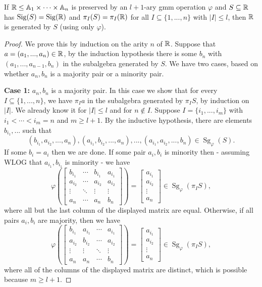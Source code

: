 \documentclass[letterpaper,11pt]{article}
\DeclareMathOperator{\Sg}{Sg}
\DeclareMathOperator{\Sig}{Sig}
\begin{document}
\begin{thm}\label{gmm-compact} If $\mathbb{R} \le \mathbb{A}_1 \times \cdots \times \mathbb{A}_n$ is preserved by an $l+1$-ary gmm operation $\varphi$ and $S \subseteq \mathbb{R}$ has $\Sig(S) = \Sig(\RR)$ and $\pi_I(S) = \pi_I(\mathbb{R})$ for all $I \subseteq \{1, ..., n\}$ with $|I| \le l$, then $\mathbb{R}$ is generated by $S$ (using only $\varphi$).
\end{thm}
\begin{proof} We prove this by induction on the arity $n$ of $\mathbb{R}$. Suppose that $a = (a_1, ..., a_n) \in \mathbb{R}$, by the induction hypothesis there is some $b_n$ with $(a_1, ..., a_{n-1}, b_n)$ in the subalgebra generated by $S$. We have two cases, based on whether $a_n,b_n$ is a majority pair or a minority pair.

{\bf Case 1: }$a_n,b_n$ is a majority pair. In this case we show that for every $I \subseteq \{1, ..., n\}$, we have $\pi_I a$ in the subalgebra generated by $\pi_I S$, by induction on $|I|$. We already know it for $|I| \le l$ and for $n \not\in I$. Suppose $I = \{i_1, ..., i_m\}$ with $i_1 < \cdots < i_m = n$ and $m \ge l+1$. By the inductive hypothesis, there are elements $b_{i_1}, ...$ such that
\[
(b_{i_1},a_{i_2},...,a_n), (a_{i_1}, b_{i_2}, ..., a_n), ..., (a_{i_1}, a_{i_2}, ..., b_n) \in \Sg_\varphi(S).
\]
If some $b_i = a_i$ then we are done. If some pair $a_i,b_i$ is minority then - assuming WLOG that $a_{i_1}, b_{i_1}$ is minority - we have
\[
\varphi\left(\begin{bmatrix} b_{i_1} & \cdots & b_{i_1} & a_{i_1}\\ a_{i_2} & \cdots & a_{i_2} & a_{i_2}\\ \vdots & \ddots & \vdots & \vdots\\ a_n & \cdots & a_n & b_n\end{bmatrix}\right) = \begin{bmatrix} a_{i_1}\\ a_{i_2}\\ \vdots\\ a_n\end{bmatrix} \in \Sg_\varphi(\pi_I S),
\]
where all but the last column of the displayed matrix are equal. Otherwise, if all pairs $a_i,b_i$ are majority, then we have
\[
\varphi\left(\begin{bmatrix} b_{i_1} & a_{i_1} & \cdots & a_{i_1}\\ a_{i_2} & b_{i_2} & \cdots & a_{i_2}\\ \vdots & \vdots & \ddots & \vdots\\ a_n & a_n & \cdots & b_n\end{bmatrix}\right) = \begin{bmatrix} a_{i_1}\\ a_{i_2}\\ \vdots\\ a_n\end{bmatrix} \in \Sg_\varphi(\pi_I S),
\]
where all of the columns of the displayed matrix are distinct, which is possible because $m \ge l+1$.


\end{proof}
\end{document}
